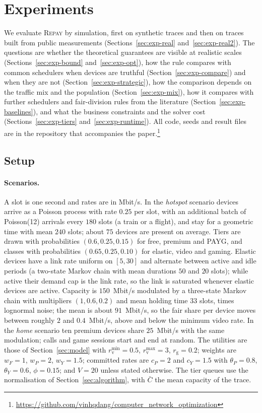 \documentclass[preprint,11pt]{elsarticle}
\theoremstyle{definition}
\theoremstyle{remark}
\newcommand{\rmin}{r^{\min}}
\newcommand{\rmax}{r^{\max}}
\newcommand{\repay}{\textsc{Repay}}
\begin{document}
\section{Experiments}\label{sec:experiments}

We evaluate \repay{} by simulation, first on synthetic traces and then on traces built from public measurements (Sections~\ref{sec:exp-real} and~\ref{sec:exp-real2}).
The questions are whether the theoretical guarantees are visible at realistic scales (Sections~\ref{sec:exp-bound} and~\ref{sec:exp-opt}), how the rule compares with common schedulers when devices are truthful (Section~\ref{sec:exp-compare}) and when they are not (Section~\ref{sec:exp-strategic}), how the comparison depends on the traffic mix and the population (Section~\ref{sec:exp-mix}), how it compares with further schedulers and fair-division rules from the literature (Section~\ref{sec:exp-baselines}), and what the business constraints and the solver cost (Sections~\ref{sec:exp-tiers} and~\ref{sec:exp-runtime}).
All code, seeds and result files are in the repository that accompanies the paper.\footnote{\url{https://github.com/vinhqdang/computer_network_optimization}}

\subsection{Setup}\label{sec:exp-setup}

\paragraph{Scenarios.}
A slot is one second and rates are in Mbit/s.
In the \emph{hotspot} scenario devices arrive as a Poisson process with rate $0.25$ per slot, with an additional batch of Poisson(12) arrivals every $180$ slots (a train or a flight), and stay for a geometric time with mean $240$ slots; about $75$ devices are present on average.
Tiers are drawn with probabilities $(0.6,0.25,0.15)$ for free, premium and PAYG, and classes with probabilities $(0.65,0.25,0.10)$ for elastic, video and gaming.
Elastic devices have a link rate uniform on $[5,30]$ and alternate between active and idle periods (a two-state Markov chain with mean durations $50$ and $20$ slots); while active their demand cap is the link rate, so the link is saturated whenever elastic devices are active.
Capacity is $150$~Mbit/s modulated by a three-state Markov chain with multipliers $(1,0.6,0.2)$ and mean holding time $33$ slots, times lognormal noise; the mean is about $91$~Mbit/s, so the fair share per device moves between roughly $2$ and $0.4$~Mbit/s, above and below the minimum video rate.
In the \emph{home} scenario ten premium devices share $25$~Mbit/s with the same modulation; calls and game sessions start and end at random.
The utilities are those of Section~\ref{sec:model} with $\rmin_{\mathrm{v}}=0.5$, $\rmax_{\mathrm{v}}=3$, $r_{\mathrm{g}}=0.2$; weights are $w_F=1$, $w_P=2$, $w_Y=1.5$; committed rates are $c_P=2$ and $c_Y=1.5$ with $\theta_P=0.8$, $\theta_Y=0.6$, $\phi=0.15$; and $V=20$ unless stated otherwise. The tier queues use the normalisation of Section~\ref{sec:algorithm}, with $\bar C$ the mean capacity of the trace.
\end{document}
